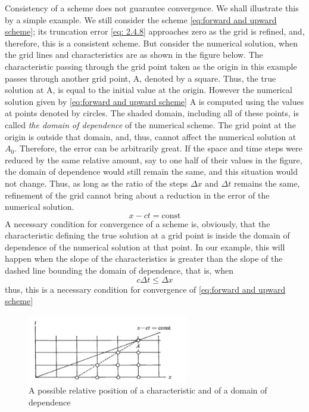 Consistency of a scheme does not guarantee convergence. We shall illustrate this by a simple example. We still consider the scheme \ref{eq:forward and upward scheme}; its truncation error \ref{eq: 2.4.8} approaches zero as the grid is refined, and, therefore, this is a consistent scheme. But consider the numerical solution, when the grid lines and characteristics are as shown in the figure below. The characteristic passing through the grid point taken as the origin in this example passes through another grid point, A, denoted by a square. Thus, the true solution at A, is equal to the initial value at the origin. However the numerical solution given by \ref{eq:forward and upward scheme} A is computed using the values at points denoted by circles. The shaded domain, including all of these points, is called \textit{the domain of dependence} of the numerical scheme. The grid point at the origin is outside that domain, and, thus, cannot affect the numerical solution at $A_0$. Therefore, the error can be arbitrarily great. If the space and time steps were reduced by the same relative amount, say to one half of their values in the figure, the domain of dependence would still remain the same, and this situation would not change. Thus, as long as the ratio of the steps $\Delta x$ and $\Delta t$ remains the same, refinement of the grid cannot bring about a reduction in the error of the numerical solution.
$$x-ct=\text{const}$$
A necessary condition for convergence of a scheme is, obviously, that the characteristic defining the true solution at a grid point is inside the domain of dependence of the numerical solution at that point. In our example, this will happen when the slope of the characteristics is greater than the slope of the dashed line bounding the domain of dependence, that is, when $$c\Delta t\leq \Delta x$$
thus, this is a necessary condition for convergence of \ref{eq:forward and upward scheme}
\begin{figure}[h]
	\centering
	\includegraphics[width=7cm]{uploads/Screenshot 2024-11-10 192132.png}
	\caption{A possible relative position of a characteristic and of a domain of dependence}
	\label{fig:grid sol}
\end{figure}
